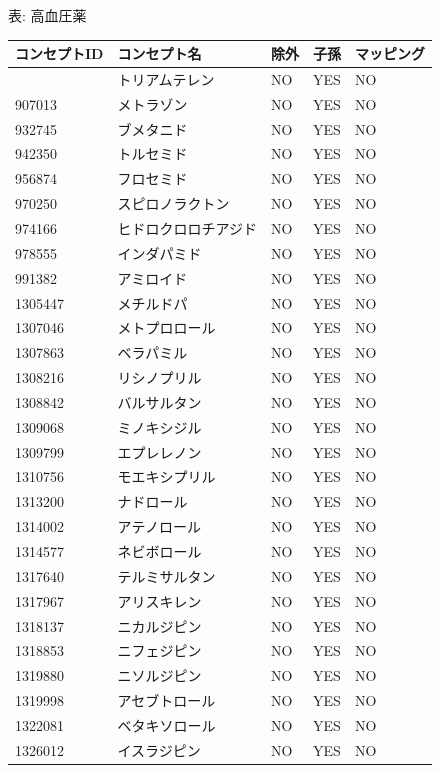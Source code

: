 \documentclass[
  11pt]{book}
\theoremstyle{definition}
\theoremstyle{definition}
\theoremstyle{definition}
\theoremstyle{definition}
\theoremstyle{remark}
\begin{document}
表: \label{tab:HTN1yrFODrugs} 高血圧薬

\begin{longtable}[]{@{}lllll@{}}
\toprule\noalign{}
コンセプトID & コンセプト名 & 除外 & 子孫 & マッピング \\
\midrule\noalign{}
\endhead
\bottomrule\noalign{}
\endlastfoot
904542 & トリアムテレン & NO & YES & NO \\
907013 & メトラゾン & NO & YES & NO \\
932745 & ブメタニド & NO & YES & NO \\
942350 & トルセミド & NO & YES & NO \\
956874 & フロセミド & NO & YES & NO \\
970250 & スピロノラクトン & NO & YES & NO \\
974166 & ヒドロクロロチアジド & NO & YES & NO \\
978555 & インダパミド & NO & YES & NO \\
991382 & アミロイド & NO & YES & NO \\
1305447 & メチルドパ & NO & YES & NO \\
1307046 & メトプロロール & NO & YES & NO \\
1307863 & ベラパミル & NO & YES & NO \\
1308216 & リシノプリル & NO & YES & NO \\
1308842 & バルサルタン & NO & YES & NO \\
1309068 & ミノキシジル & NO & YES & NO \\
1309799 & エプレレノン & NO & YES & NO \\
1310756 & モエキシプリル & NO & YES & NO \\
1313200 & ナドロール & NO & YES & NO \\
1314002 & アテノロール & NO & YES & NO \\
1314577 & ネビボロール & NO & YES & NO \\
1317640 & テルミサルタン & NO & YES & NO \\
1317967 & アリスキレン & NO & YES & NO \\
1318137 & ニカルジピン & NO & YES & NO \\
1318853 & ニフェジピン & NO & YES & NO \\
1319880 & ニソルジピン & NO & YES & NO \\
1319998 & アセブトロール & NO & YES & NO \\
1322081 & ベタキソロール & NO & YES & NO \\
1326012 & イスラジピン & NO & YES & NO \\

\end{longtable}
\end{document}
